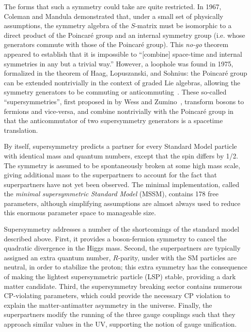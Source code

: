 The forms that such a symmetry could take are quite restricted. In 1967, Coleman and Mandula demonstrated that, under a small set of physically assumptions, the symmetry algebra of the $S$-matrix must be isomorphic to a direct product of the Poincar\'{e} group and an internal symmetry group (i.e. whose generators commute with those of the Poincar\'{e} group). This \emph{no-go} theorem appeared to establish that it is impossible to ``[combine] space-time and internal symmetries in any but a trivial way.'' However, a loophole was found in 1975, formalized in the theorem of Haag, Lopuszanski, and Sohnius: the Poincar\'{e} group can be extended nontrivially in the context of graded Lie algebras, allowing the symmetry generators to be commuting or anticommuting~\cite{Haag1975257}. These so-called ``supersymmetries'', first proposed in by Wess and Zumino~\cite{Wess197439}, transform bosons to fermions and vice-versa, and combine nontrivially with the Poincar\'{e} group in that the anticommutator of two supersymmetry generators is a spacetime translation. 

By itself, supersymmetry predicts a partner for every Standard Model particle with identical mass and quantum numbers, except that the spin differs by 1/2. The symmetry is assumed to be spontaneously broken at some high mass scale, giving additional mass to the superpartners to account for the fact that superpartners have not yet been observed. The minimal implementation, called the \emph{minimal supersymmetric Standard Model} (MSSM), contains 178 free parameters, although simplifying assumptions are almost always used to reduce this enormous parameter space to manageable size.

Supersymmetry addresses a number of the shortcomings of the standard model described above. First, it provides a boson-fermion symmetry to cancel the quadratic divergence in the Higgs mass. Second, the superpartners are typically assigned an extra quantum number, $R$-parity, under with the SM particles are neutral, in order to stabilize the proton; this extra symmetry has the consequence of making the lightest supersymmetric particle (LSP) stable, providing a dark matter candidate. Third, the supersymmetry breaking sector contains numerous CP-violating parameters, which could provide the necessary CP violation to explain the matter-antimatter asymmetry in the universe. Finally, the superpartners modify the running of the three gauge couplings such that they approach similar values in the UV, supporting the notion of gauge unification. 

